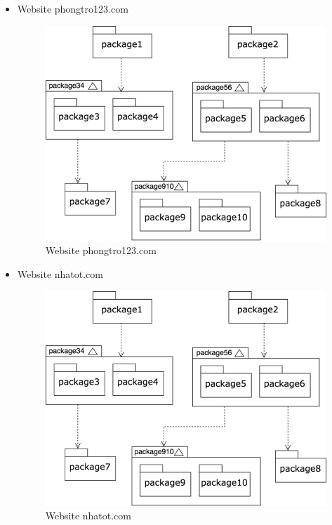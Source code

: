 \documentclass[../Main.tex]{subfiles}
\begin{document}
\begin{itemize}
    \item Website phongtro123.com
          \begin{figure}[H]
              \centering
              \includegraphics{Figure/phongtro123.png}
              \caption{Website phongtro123.com}
              \label{fig:phongtro123}
          \end{figure}
    \item Website nhatot.com
          \begin{figure}[H]
              \centering
              \includegraphics{Figure/nhatot.png}
              \caption{Website nhatot.com}
              \label{fig:nhatot}

\end{figure}
\end{itemize}
\end{document}
